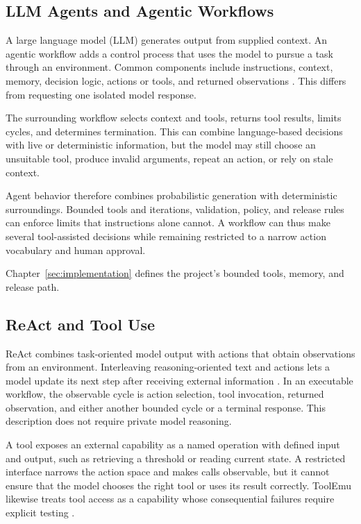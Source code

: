 \subsection{LLM Agents and Agentic Workflows}\label{subsec:theory-agents}

A large language model (LLM) generates output from supplied context. An agentic
workflow adds a control process that uses the model to pursue a task through an
environment. Common components include instructions, context, memory, decision
logic, actions or tools, and returned observations \cite{wang2024surveyagents}.
This differs from requesting one isolated model response.

The surrounding workflow selects context and tools, returns tool results, limits
cycles, and determines termination. This can combine language-based decisions
with live or deterministic information, but the model may still choose an
unsuitable tool, produce invalid arguments, repeat an action, or rely on stale
context.

Agent behavior therefore combines probabilistic generation with deterministic
surroundings. Bounded tools and iterations, validation, policy, and release rules
can enforce limits that instructions alone cannot. A workflow can thus make
several tool-assisted decisions while remaining restricted to a narrow action
vocabulary and human approval.

Chapter~\ref{sec:implementation} defines the project's bounded tools, memory,
and release path.

\subsection{ReAct and Tool Use}\label{subsec:theory-react}

ReAct combines task-oriented model output with actions that obtain observations
from an environment. Interleaving reasoning-oriented text and actions lets a
model update its next step after receiving external information
\cite{yao2023react}. In an executable workflow, the observable cycle is action
selection, tool invocation, returned observation, and either another bounded
cycle or a terminal response. This description does not require private model
reasoning.

A tool exposes an external capability as a named operation with defined input
and output, such as retrieving a threshold or reading current state. A restricted
interface narrows the action space and makes calls observable, but it cannot
ensure that the model chooses the right tool or uses its result correctly.
ToolEmu likewise treats tool access as a capability whose consequential failures
require explicit testing \cite{ruan2024toolemu}.

